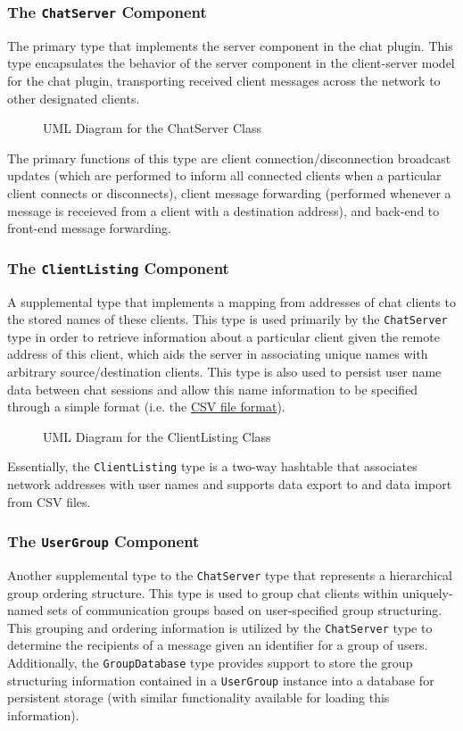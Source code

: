 \documentclass{article}
\newcommand{\classname}[1] {\texttt{#1}}
\newcommand{\insertdiagram}[2]
{
	\begin{figure}[H]
		\centering
		\fbox{\texttt{[image: figures/\#1]}}
		\caption{UML Diagram for the #1 Class}
	\end{figure}
}
\begin{document}
			\subsubsection[\classname{ChatServer}]{The \classname{ChatServer} Component}
			The primary type that implements the server 
			component in the chat plugin.  This type encapsulates the behavior of 
			the server component in the client-server model for the chat plugin, 
			transporting received client messages across the network to other 
			designated clients.

			\insertdiagram{ChatServer}{1.1in}

			The primary functions of this type are client connection/disconnection
			broadcast updates (which are performed to inform all connected clients
			when a particular client connects or disconnects), client message
			forwarding (performed whenever a message is receieved from a client
			with a destination address), and back-end to front-end message forwarding.

			\subsubsection[\classname{ClientListing}]{The \classname{ClientListing} Component}
			A supplemental type that implements a
			mapping from addresses of chat clients to the stored names of these
			clients.  This type is used primarily by the \classname{ChatServer} type
			in order to retrieve information about a particular client given the
			remote address of this client, which aids the server in associating
			unique names with arbitrary source/destination clients.  This type
			is also used to persist user name data between chat sessions and allow
			this name information to be specified through a simple format (i.e.
			the \href{http://en.wikipedia.org/wiki/Comma-separated\textunderscore values}{CSV file format}).

			\insertdiagram{ClientListing}{2.0in}

			Essentially, the \classname{ClientListing} type is a two-way hashtable
			that associates network addresses with user names and supports data
			export to and data import from CSV files.

			\subsubsection[\classname{UserGroup}]{The \classname{UserGroup} Component}
			Another supplemental type to the 
			\classname{ChatServer} type that represents a hierarchical group ordering
			structure.  This type is used to group chat clients within 
			uniquely-named sets of communication groups based on user-specified 
			group structuring.  This grouping and ordering information is utilized
			by the \classname{ChatServer} type to determine the recipients of a 
			message given an identifier for a group of users.  Additionally, the
			\classname{GroupDatabase} type provides support to store the group 
			structuring information contained in a \classname{UserGroup} 
			instance into a database for persistent storage (with similar
			functionality available for loading this information).
\end{document}
